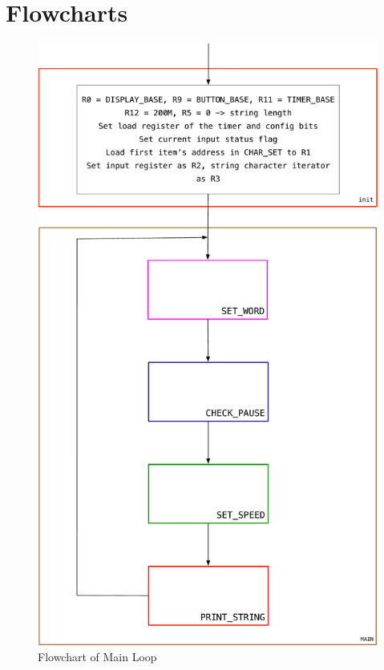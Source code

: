\documentclass[titlepage]{article}
\begin{document}
	\section{Flowcharts}
	\begin{figure}[h]
		\centering
		\includegraphics[scale=.27]{../images/main.pdf}
		\caption{Flowchart of Main Loop}
	\end{figure}
\end{document}
